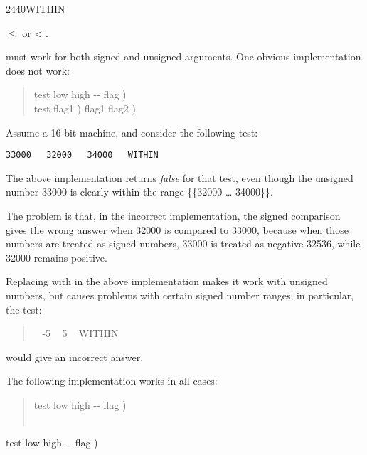 \begin{worddef}{2440}{WITHIN}
\begin{rationale}
		\begin{center}
			 $\le$  or  < .
		\end{center}
		 must work for both signed and unsigned arguments.
		One obvious implementation does not work:
		\begin{quote}\ttfamily
			\word{:}   test low high -{}- flag ) \\
			\tab {}     test flag1 )
				    flag1 flag2 )
				 \\
			\word{;}
		\end{quote}
		Assume a 16-bit machine, and consider the following test:

		\tab \texttt{33000 ~ 32000 ~ 34000 ~ WITHIN}

		The above implementation returns \emph{false} for that test,
		even though the unsigned number 33000 is clearly within the
		range \{\{32000 {\ldots} 34000\}\}.

		The problem is that, in the incorrect implementation, the
		signed comparison  gives the wrong answer when 32000
		is compared to 33000, because when those numbers are treated
		as signed numbers, 33000 is treated as negative 32536, while
		32000 remains positive.

		Replacing  with  in the above implementation
		makes it work with unsigned numbers, but causes problems with
		certain signed number ranges; in particular, the test:
		\begin{quote} ~ -5 ~ 5 ~ WITHIN
		\end{quote}
		would give an incorrect answer.

		The following implementation works in all cases:
		\begin{quote}\ttfamily
			\word{:}   test low high -{}- flag ) \\
			\tab ~ \word{-}  \word{-}   \\
			\word{;}
		\end{quote}
	\end{rationale}

	\begin{implement} %
		\word{:}   test low high -{}- flag ) \\
		\tab {} \word{-}  \word{-}   \\
		\word{;}
	\end{implement}
\end{worddef}


